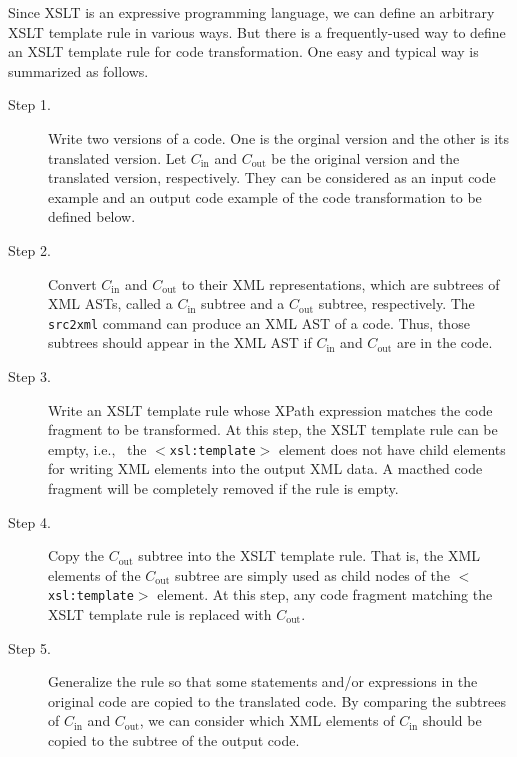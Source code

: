 Since XSLT is an expressive programming language, we can define an
arbitrary XSLT template rule in various ways.  But there is a
frequently-used way to define an XSLT template rule for code
transformation.  One easy and typical way is summarized as follows.
\begin{description}
 \item[Step 1.] Write two versions of a code. One is the orginal version
	    and the other is its translated version. Let $C_\mathrm{in}$
	    and $C_\mathrm{out}$ be the original version and the
	    translated version, respectively. They can be considered as
	    an input code example and an output code example of the code
	    transformation to be defined below.

 \item[Step 2.] Convert $C_\mathrm{in}$ and $C_\mathrm{out}$ to their
	    XML representations, which are subtrees of XML ASTs, called
	    a $C_\mathrm{in}$ subtree and a $C_\mathrm{out}$ subtree,
	    respectively. The \texttt{src2xml} command can produce an
	    XML AST of a code. Thus, those subtrees should appear in the
	    XML AST if $C_\mathrm{in}$ and $C_\mathrm{out}$ are in the
	    code.

 \item[Step 3.] Write an XSLT template rule whose XPath expression
	    matches the code fragment to be transformed.  At this step,
	    the XSLT template rule can be empty, i.e.,~ the
	    \texttt{$<$xsl:template$>$} element does not have child
	    elements for writing XML elements into the output XML
	    data. A macthed code fragment will be completely removed if
	    the rule is empty.

 \item[Step 4.] Copy the $C_\mathrm{out}$ subtree into the XSLT template
	    rule. That is, the XML elements of the $C_\mathrm{out}$
	    subtree are simply used as child nodes of the
	    \texttt{$<$xsl:template$>$} element. At this step, any code
	    fragment matching the XSLT template rule is replaced with
	    $C_\mathrm{out}$.

 \item[Step 5.] Generalize the rule so that some statements and/or
	    expressions in the original code are copied to the
	    translated code. By comparing the subtrees of
	    $C_\mathrm{in}$ and $C_\mathrm{out}$, we can consider which
	    XML elements of $C_\mathrm{in}$ should be copied to the
	    subtree of the output code.
\end{description}


